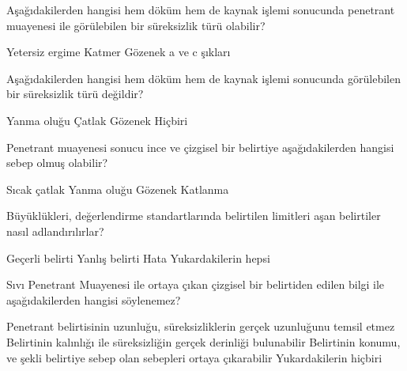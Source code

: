 \begin{question}[subtitle=]
Aşağıdakilerden hangisi hem döküm hem de kaynak işlemi sonucunda penetrant muayenesi ile görülebilen bir süreksizlik türü olabilir?
	\begin{tasks}
          \task Yetersiz ergime
          \task Katmer
          \task Gözenek \correct
          \task a ve c şıkları
	\end{tasks}
\end{question}
\begin{solution}
	\correct
\end{solution}

\begin{question}[subtitle=]
Aşağıdakilerden hangisi hem döküm hem de kaynak işlemi sonucunda görülebilen bir süreksizlik türü değildir?
	\begin{tasks}
          \task Yanma oluğu \correct
          \task Çatlak
          \task Gözenek
          \task Hiçbiri
	\end{tasks}
\end{question}
\begin{solution}
	\correct
\end{solution}

\begin{question}[subtitle=]
Penetrant muayenesi sonucu ince ve çizgisel bir belirtiye aşağıdakilerden hangisi sebep olmuş olabilir?
	\begin{tasks}
          \task Sıcak çatlak
          \task Yanma oluğu
          \task Gözenek
          \task Katlanma \correct
	\end{tasks}
\end{question}
\begin{solution}
	\correct
\end{solution}

\begin{question}[subtitle=]
Büyüklükleri, değerlendirme standartlarında belirtilen limitleri aşan belirtiler nasıl adlandırılırlar?
	\begin{tasks}
          \task Geçerli belirti
          \task Yanlış belirti
          \task Hata \correct
          \task Yukardakilerin hepsi
	\end{tasks}
\end{question}
\begin{solution}
	\correct
\end{solution}

\begin{question}[subtitle=]
Sıvı Penetrant Muayenesi ile ortaya çıkan çizgisel bir belirtiden edilen bilgi ile aşağıdakilerden hangisi söylenemez?
	\begin{tasks}
          \task Penetrant belirtisinin uzunluğu, süreksizliklerin gerçek uzunluğunu temsil etmez
          \task Belirtinin kalınlığı ile süreksizliğin gerçek derinliği bulunabilir \correct
          \task Belirtinin konumu, ve şekli belirtiye sebep olan sebepleri ortaya çıkarabilir
          \task Yukardakilerin hiçbiri
	\end{tasks}
\end{question}
\begin{solution}
	\correct
\end{solution}
